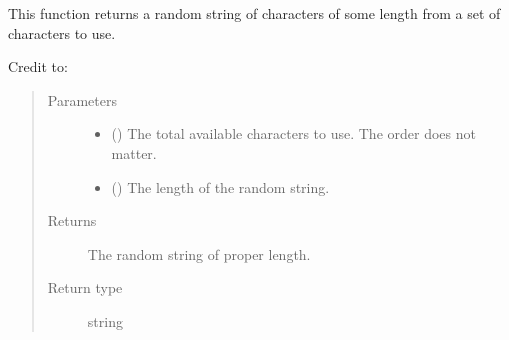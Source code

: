 \documentclass[letterpaper,10pt,english]{sphinxmanual}
\begin{document}
\begin{fulllineitems}
\label{\detokenize{docstrings/ifa_smeargle.core.string_formatting:ifa_smeargle.core.string_formatting.random_string}}
This function returns a random string of characters of
some length from a set of characters to use.

Credit to: 
\begin{quote}\begin{description}
\item[{Parameters}] \leavevmode\begin{itemize}
\item {} 
 () \textendash{} The total available characters to use. The order does
not matter.

\item {} 
 () \textendash{} The length of the random string.

\end{itemize}

\item[{Returns}] \leavevmode
{} \textendash{} The random string of proper length.

\item[{Return type}] \leavevmode
string

\end{description}\end{quote}

\end{fulllineitems}

\end{document}
